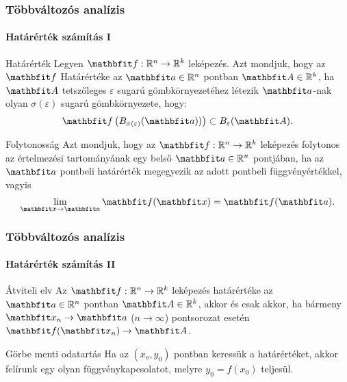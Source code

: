 \begin{frame}
  \frametitle{Többváltozós analízis}
  \framesubtitle{Határérték számítás I}

  \begin{block}{Határérték}
    Legyen $\rvec f: \mathbb R^n \rightarrow \mathbb R^k$ leképezés. Azt
    mondjuk, hogy az $\rvec f$ Határértéke az $\rvec a \in \mathbb R^n$ pontban
    $\rvec A \in \mathbb R^k$, ha $\rvec A$ tetszőleges $\varepsilon$ sugarú
    gömbkörnyezetéhez létezik $\rvec a$-nak olyan $\sigma(\varepsilon)$ sugarú
    gömbkörnyezete, hogy:
    \[
      \rvec f \left(
      B_{\sigma(\varepsilon)}(\rvec a))
      \right)
      \subset
      B_\varepsilon(\rvec A)
      \text.
    \]
  \end{block}

  \begin{block}{Folytonosság}
    Azt mondjuk, hogy az $\rvec f: \mathbb R^n \rightarrow \mathbb R^k$
    leképezés folytonos az értelmezési tartományának egy belső $\rvec a \in
      \mathbb R^n$ pontjában, ha az $\rvec a$ pontbeli határérték megegyezik az
    adott pontbeli függvényértékkel, vagyis
    \[
      \lim_{\rvec x \rightarrow \rvec a} \rvec f(\rvec x) = \rvec f(\rvec a)
      \text.
    \]
  \end{block}
\end{frame}

\begin{frame}
  \frametitle{Többváltozós analízis}
  \framesubtitle{Határérték számítás II}

  \begin{block}{Átviteli elv}
    Az $\rvec f: \mathbb R^n \rightarrow \mathbb R^k$ leképezés határértéke az
    $\rvec a \in \mathbb R^n$ pontban $\rvec A \in \mathbb R^k$, akkor és csak
    akkor, ha bármeny $\rvec x_n \rightarrow \rvec a$ ($n \rightarrow \infty$)
    pontsorozat esetén $\rvec f (\rvec x_n) \rightarrow \rvec A$.
  \end{block}

  \begin{block}{Görbe menti odatartás}
    Ha az $(x_o, y_0)$ pontban keressük a határértéket, akkor felírunk egy
    olyan függvénykapcsolatot, melyre $y_0 = f(x_0)$ teljesül.
  \end{block}
\end{frame}

